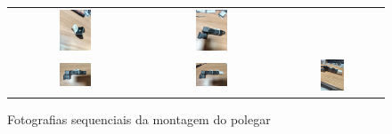 \begin{figure}[H]
\begin{tabular}{ccc}
  \includegraphics[width=0.25\textwidth]{figs/appendix/polegar/5.jpg} &
  \includegraphics[width=0.25\textwidth]{figs/appendix/polegar/6.jpg} \\
  \includegraphics[width=0.25\textwidth]{figs/appendix/polegar/7.jpg} &
  \includegraphics[width=0.25\textwidth]{figs/appendix/polegar/8.jpg} &
  \includegraphics[width=0.25\textwidth]{figs/appendix/polegar/9.jpg} \\
\end{tabular}
\caption{Fotografias sequenciais da montagem do polegar}
\end{figure}
\label{appendix:montagem_polegar}

